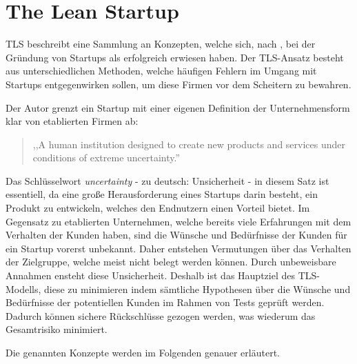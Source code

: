 \section{The Lean Startup}
\label{sec:LeanStartup}
\ac{TLS} beschreibt eine Sammlung an Konzepten, welche sich, nach , bei der Gründung von Startups als erfolgreich erwiesen haben. Der \ac{TLS}-Ansatz besteht aus unterschiedlichen Methoden, welche häufigen Fehlern im Umgang mit Startups entgegenwirken sollen, um diese Firmen vor dem Scheitern zu bewahren.

Der Autor grenzt ein Startup mit einer eigenen Definition der Unternehmensform klar von etablierten Firmen ab:
\begin{quote}
,,A human institution designed to create new products and services under conditions of extreme uncertainty.'' \cite[S. 8]{TheLeanStartup}
\end{quote}
Das Schlüsselwort \textit{uncertainty} - zu deutsch: Unsicherheit - in diesem Satz ist essentiell, da eine große Herausforderung eines Startups darin besteht, ein Produkt zu entwickeln, welches den Endnutzern einen Vorteil bietet. Im Gegensatz zu etablierten Unternehmen, welche bereits viele Erfahrungen mit dem Verhalten der Kunden haben, sind die Wünsche und Bedürfnisse der Kunden für ein Startup vorerst unbekannt. Daher entstehen Vermutungen über das Verhalten der Zielgruppe, welche meist nicht belegt werden können. Durch unbeweisbare Annahmen ensteht diese Unsicherheit. Deshalb ist das Hauptziel des \ac{TLS}-Modells, diese zu minimieren indem sämtliche Hypothesen über die Wünsche und Bedürfnisse der potentiellen Kunden im Rahmen von Tests geprüft werden. Dadurch können sichere Rückschlüsse gezogen werden, was wiederum das Gesamtrisiko minimiert.

Die genannten Konzepte werden im Folgenden genauer erläutert.

